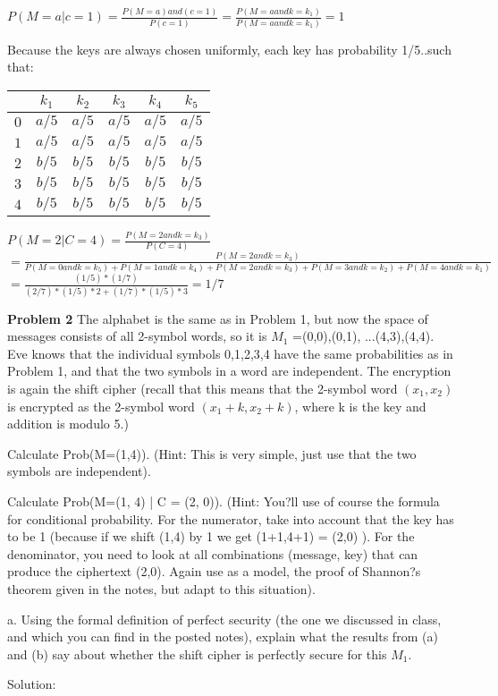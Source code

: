 \documentclass[12pt,letterpaper,final]{report}
\begin{document}
\bigskip $P (M = a | c = 1) = \frac{P(M=a) and  (c = 1)}{P (c = 1)} = \frac{P(M=a  and   k = k_{1})}{P (M = a and  k = k_{1})} = 1$

\bigskip Because the keys are always chosen uniformly, each key has probability 1/5..such that:  
\indent\begin{tabular}{|c|c|c|c|c|c|}
\hline
$ $ & $k_{1}$ & $k_{2}$ & $k_{3}$ & $k_{4}$ & $k_{5}$ \\
\hline
$0$ & $ a/5$ & $ a/5$ & $ a/5$ & $ a/5$ & $ a/5$ \\
$1$ & $ a/5$ & $ a/5$ & $ a/5$ & $ a/5$ & $ a/5$ \\
$2$ & $ b/5$ & $ b/5$ & $ b/5$ & $ b/5$ & $ b/5$ \\
$3$ & $ b/5$ & $ b/5$ & $ b/5$ & $ b/5$ & $ b/5$ \\
$4$ & $ b/5$ & $ b/5$ & $ b/5$ & $ b/5$ & $ b/5$ \\
\hline
\end{tabular}

\bigskip\newline
$P (M=2 | C = 4) = \frac{P(M=2 and k=k_3)}{P(C=4)}$
\newline$=\frac{P(M=2 and k=k_3)}{P(M=0 and k=k_5) + P(M=1 and k=k_4) + P(M=2 and k=k_3) + P(M=3 and k=k_2) + P(M=4 and k=k_1)}$
\newline$=\frac{(1/5)*(1/7)}{(2/7)*(1/5)*2 + (1/7)*(1/5)*3} = 1/7$

\bigskip
\noindent\textbf{Problem 2} The alphabet is the same as in Problem 1, but now the space of messages consists of all 2-symbol words, so it is $M_{1}$ ={(0,0),(0,1), ...(4,3),(4,4)}. Eve knows that the individual symbols 0,1,2,3,4 have the same probabilities as in Problem 1, and that the two symbols in a word are independent. The encryption is again the shift cipher (recall that this means that the 2-symbol word
 $(x_{1}, x_{2})$ is encrypted as the 2-symbol word  $(x_{1}+k, x_{2}+k)$, where k is the key and addition is modulo 5.)

\bigskip
{}
\begin{alphalist}
	\item Calculate Prob(M=(1,4)). (Hint: This is very simple, just use that the two symbols are independent).
	\item Calculate Prob(M=(1, 4) | C = (2, 0)). (Hint: You?ll use of course the formula for conditional probability. For the numerator, take into account that the key has to be 1 (because if we shift (1,4) by 1 we get (1+1,4+1) = (2,0) ). For the denominator, you need to look at all combinations (message, key) that can produce the ciphertext (2,0).  Again use as a model, the proof of Shannon?s theorem given in the notes, but adapt to this situation).
	\item a.	Using the formal definition of perfect security (the one we discussed in class, and which you can find in the posted notes), explain what the results from (a) and (b) say about whether the shift cipher is perfectly secure for this $M_{1}$.
\end{alphalist}


\bigskip Solution: 
\bigskip
\end{document}
